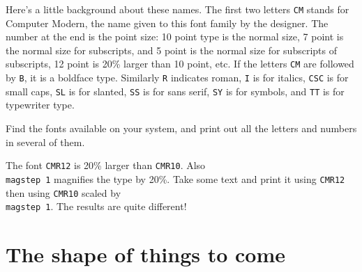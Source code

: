 \bigskip 

Here's a little background about these names.  The first two 
letters {\tt CM} stands for Computer Modern, the name given to 
this font family by the designer. The number at the end is the 
point size: 10 point type is the normal size, 7 point is the 
normal size for subscripts, and 5 point is the normal size for 
subscripts of subscripts, 12 point is 20\% larger than 10 point, 
etc. If the letters {\tt CM} are followed by {\tt B}, it is a 
boldface type.  Similarly {\tt R} indicates roman, {\tt I} is for 
italics, {\tt CSC} is for small caps, {\tt SL} is for slanted, 
{\tt SS} is for sans serif, {\tt SY} is for symbols, 
and {\tt TT} is for typewriter type. 

\exercise Find the fonts available on your system, and print out 
all the letters and numbers in several of them. 

\exercise The font {\tt CMR12} is 20\% larger than {\tt CMR10}. 
Also {\tt \\magstep~1} magnifies the type by 20\%.  Take some 
text and print it using {\tt CMR12} then using {\tt CMR10} scaled 
by {\tt \\magstep~1}. The results are quite different! 




\section{The shape of things to come} 

